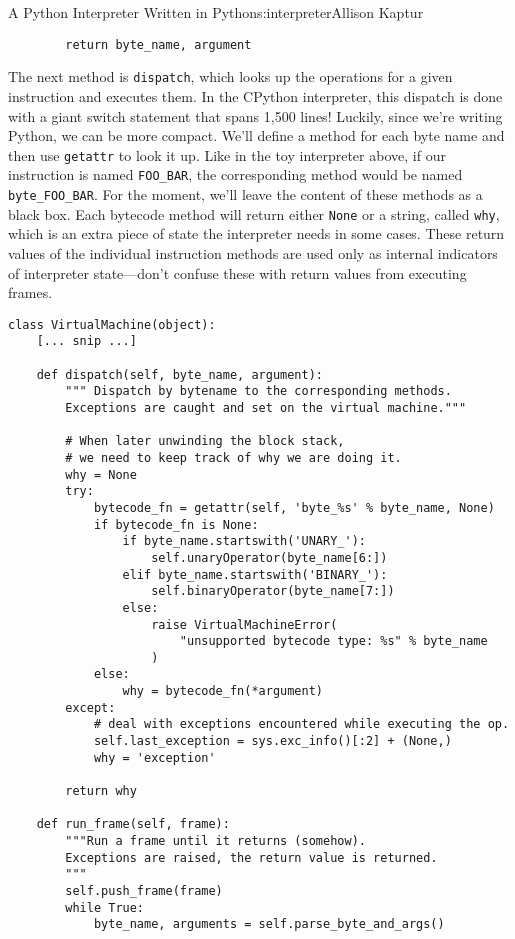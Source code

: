 \begin{aosachapter}{A Python Interpreter Written in Python}{s:interpreter}{Allison Kaptur}
\begin{verbatim}
        return byte_name, argument
\end{verbatim}

The next method is \texttt{dispatch}, which looks up the operations for
a given instruction and executes them. In the CPython interpreter, this
dispatch is done with a giant switch statement that spans 1,500 lines!
Luckily, since we're writing Python, we can be more compact. We'll
define a method for each byte name and then use \texttt{getattr} to look
it up. Like in the toy interpreter above, if our instruction is named
\texttt{FOO\_BAR}, the corresponding method would be named
\texttt{byte\_FOO\_BAR}. For the moment, we'll leave the content of
these methods as a black box. Each bytecode method will return either
\texttt{None} or a string, called \texttt{why}, which is an extra piece
of state the interpreter needs in some cases. These return values of the
individual instruction methods are used only as internal indicators of
interpreter state---don't confuse these with return values from
executing frames.

\begin{verbatim}
class VirtualMachine(object):
    [... snip ...]

    def dispatch(self, byte_name, argument):
        """ Dispatch by bytename to the corresponding methods.
        Exceptions are caught and set on the virtual machine."""

        # When later unwinding the block stack,
        # we need to keep track of why we are doing it.
        why = None
        try:
            bytecode_fn = getattr(self, 'byte_%s' % byte_name, None)
            if bytecode_fn is None:
                if byte_name.startswith('UNARY_'):
                    self.unaryOperator(byte_name[6:])
                elif byte_name.startswith('BINARY_'):
                    self.binaryOperator(byte_name[7:])
                else:
                    raise VirtualMachineError(
                        "unsupported bytecode type: %s" % byte_name
                    )
            else:
                why = bytecode_fn(*argument)
        except:
            # deal with exceptions encountered while executing the op.
            self.last_exception = sys.exc_info()[:2] + (None,)
            why = 'exception'

        return why

    def run_frame(self, frame):
        """Run a frame until it returns (somehow).
        Exceptions are raised, the return value is returned.
        """
        self.push_frame(frame)
        while True:
            byte_name, arguments = self.parse_byte_and_args()


\end{verbatim}
\end{aosachapter}
